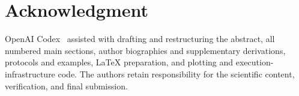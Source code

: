 \documentclass{ieeeaccess}
\begin{document}
\titlepgskip=-21pt
\maketitle
\raggedbottom





\FloatBarrier






\section*{Acknowledgment}
OpenAI Codex~\cite{openaiCodex2026} assisted with drafting and restructuring
the abstract, all numbered main sections, author biographies and supplementary derivations, protocols and examples,
LaTeX preparation, and plotting and execution-infrastructure code.
The authors retain responsibility for the scientific content, verification,
and final submission.
\FloatBarrier



\EOD
\end{document}
